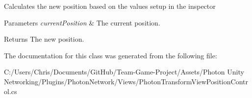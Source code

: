Calculates the new position based on the values setup in the inspector 


\begin{DoxyParams}{Parameters}
{\em current\+Position} & The current position.\\
\hline
\end{DoxyParams}
\begin{DoxyReturn}{Returns}
The new position.
\end{DoxyReturn}


The documentation for this class was generated from the following file\+:\begin{DoxyCompactItemize}
\item 
C\+:/\+Users/\+Chris/\+Documents/\+Git\+Hub/\+Team-\/\+Game-\/\+Project/\+Assets/\+Photon Unity Networking/\+Plugins/\+Photon\+Network/\+Views/Photon\+Transform\+View\+Position\+Control.\+cs\end{DoxyCompactItemize}

